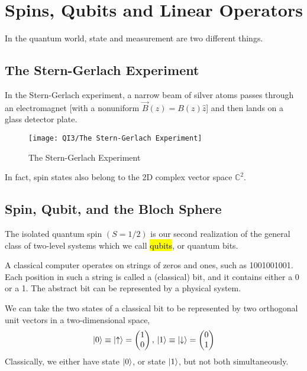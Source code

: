 \newpage
\section{Spins, Qubits and Linear Operators}

In the quantum world, state and measurement are two different things.

\subsection{The Stern-Gerlach Experiment}
In the Stern-Gerlach experiment, a narrow beam of silver atoms passes through an electromagnet [with a nonuniform $\vec{B}(z)=B(z)\hat{z}$] and then lands on a glass detector plate.

\begin{figure}[H]
    \centering
    \texttt{[image: QI3/The Stern-Gerlach Experiment]}
    \caption{The Stern-Gerlach Experiment}
\end{figure}

In fact, spin states also belong to the 2D complex vector space $\mathbb{C}^2$. 

\subsection{Spin, Qubit, and the Bloch Sphere}
The isolated quantum spin $(S = 1/2)$ is our second realization of the general class of two-level systems which we call \hl{qubits}, or quantum bits.

A classical computer operates on strings of zeros and ones, such as 1001001001. Each position in such a string is called a (classical) bit, and it contains either a 0 or a 1. The abstract bit can be represented by a physical system. 

We can take the two states of a classical bit to be represented by two orthogonal unit vectors in a two-dimensional space,
\begin{align*}
    \ket{0}\equiv \ket{\uparrow}=\begin{pmatrix}
        1\\ 0
    \end{pmatrix}, \,
    \ket{1}\equiv \ket{\downarrow}= \begin{pmatrix}
        0\\ 1
    \end{pmatrix}
\end{align*}
Classically, we either have state $\ket{0}$, or state $\ket{1}$, but not both simultaneously.

